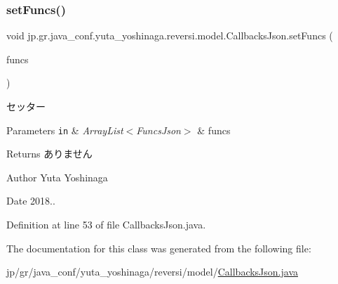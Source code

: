 \subsubsection{\texorpdfstring{set\+Funcs()}{setFuncs()}}
{\footnotesize\ttfamily void jp.\+gr.\+java\+\_\+conf.\+yuta\+\_\+yoshinaga.\+reversi.\+model.\+Callbacks\+Json.\+set\+Funcs (\begin{DoxyParamCaption}\item[{Array\+List$<$ \hyperlink{classjp_1_1gr_1_1java__conf_1_1yuta__yoshinaga_1_1reversi_1_1model_1_1_funcs_json}{Funcs\+Json} $>$}]{funcs }\end{DoxyParamCaption})}



セッター 


\begin{DoxyParams}[1]{Parameters}
\mbox{\tt in}  & {\em Array\+List$<$\+Funcs\+Json$>$} & funcs \\
\hline
\end{DoxyParams}
\begin{DoxyReturn}{Returns}
ありません 
\end{DoxyReturn}
\begin{DoxyAuthor}{Author}
Yuta Yoshinaga 
\end{DoxyAuthor}
\begin{DoxyDate}{Date}
2018.. 
\end{DoxyDate}


Definition at line 53 of file Callbacks\+Json.\+java.



The documentation for this class was generated from the following file\+:\begin{DoxyCompactItemize}
\item 
jp/gr/java\+\_\+conf/yuta\+\_\+yoshinaga/reversi/model/\hyperlink{_callbacks_json_8java}{Callbacks\+Json.\+java}\end{DoxyCompactItemize}
